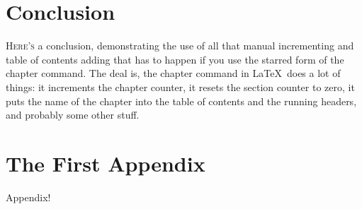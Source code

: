 \documentclass[12pt]{reedthesis}
\theoremstyle{plain}
\theoremstyle{definition}
\begin{document}
\chapter*{Conclusion}

\lettrine{H}{ere's} a conclusion, demonstrating the use of all that manual incrementing and table of contents adding that has to happen if you use the starred form of the chapter command. The deal is, the chapter command in \LaTeX\ does a lot of things: it increments the chapter counter, it resets the section counter to zero, it puts the name of the chapter into the table of contents and the running headers, and probably some other stuff. 


\appendix
\chapter{The First Appendix}

Appendix!


\backmatter%

\nocite{*}


\end{document}
